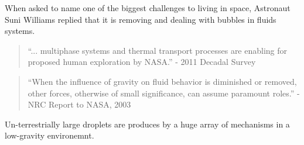 \documentclass[10pt,a4paper]{article}
\begin{document}
When asked to name one of the biggest challenges to living in
space, Astronaut Suni Williams replied that it is removing and
dealing with bubbles in fluids systems.

\begin{quote}
``... multiphase systems and thermal transport processes are enabling for proposed human exploration by NASA.''
- 2011 Decadal Survey
\end{quote}

\begin{quote}
``When the influence of gravity on fluid behavior is diminished or removed, other forces, otherwise of small significance, can assume paramount roles.''
- NRC Report to NASA, 2003
\end{quote}

Un-terrestrially large droplets are produces by a huge array of mechanisms in a low-gravity environemnt.
\end{document}

